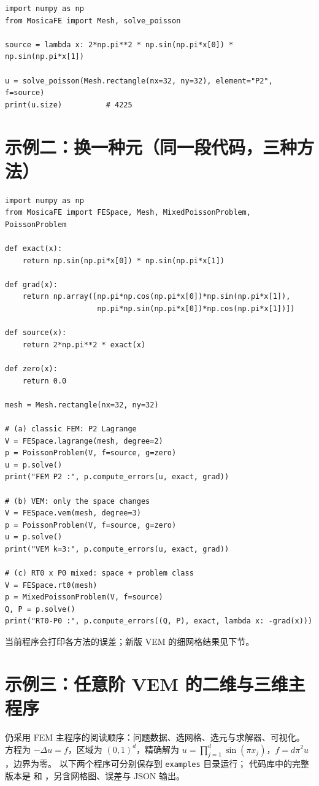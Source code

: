 \documentclass[UTF8,11pt,oneside]{ctexbook}
\theoremstyle{definition}
\theoremstyle{plain}
\newcommand{\code}[1]{\texttt{#1}}
\begin{document}
\begin{lstlisting}[language=MosicaFE,caption={示例 10.1：一行式求解}]
import numpy as np
from MosicaFE import Mesh, solve_poisson

source = lambda x: 2*np.pi**2 * np.sin(np.pi*x[0]) * np.sin(np.pi*x[1])

u = solve_poisson(Mesh.rectangle(nx=32, ny=32), element="P2", f=source)
print(u.size)          # 4225
\end{lstlisting}

\section{示例二：换一种元（同一段代码，三种方法）}

\begin{lstlisting}[language=MosicaFE,caption={示例 10.2：FEM / VEM / RT0 共用同一套流程},label={lst:three}]
import numpy as np
from MosicaFE import FESpace, Mesh, MixedPoissonProblem, PoissonProblem

def exact(x):
    return np.sin(np.pi*x[0]) * np.sin(np.pi*x[1])

def grad(x):
    return np.array([np.pi*np.cos(np.pi*x[0])*np.sin(np.pi*x[1]),
                     np.pi*np.sin(np.pi*x[0])*np.cos(np.pi*x[1])])

def source(x):
    return 2*np.pi**2 * exact(x)

def zero(x):
    return 0.0

mesh = Mesh.rectangle(nx=32, ny=32)

# (a) classic FEM: P2 Lagrange
V = FESpace.lagrange(mesh, degree=2)
p = PoissonProblem(V, f=source, g=zero)
u = p.solve()
print("FEM P2 :", p.compute_errors(u, exact, grad))

# (b) VEM: only the space changes
V = FESpace.vem(mesh, degree=3)
p = PoissonProblem(V, f=source, g=zero)
u = p.solve()
print("VEM k=3:", p.compute_errors(u, exact, grad))

# (c) RT0 x P0 mixed: space + problem class
V = FESpace.rt0(mesh)
p = MixedPoissonProblem(V, f=source)
Q, P = p.solve()
print("RT0-P0 :", p.compute_errors((Q, P), exact, lambda x: -grad(x)))
\end{lstlisting}

当前程序会打印各方法的误差；新版 VEM 的细网格结果见下节。

\section{示例三：任意阶 VEM 的二维与三维主程序}
仍采用 FEM 主程序的阅读顺序：问题数据、选网格、选元与求解器、可视化。
方程为 $-\Delta u=f$，区域为 $(0,1)^d$，精确解为
$u=\prod_{j=1}^d\sin(\pi x_j)$，$f=d\pi^2u$，边界为零。
以下两个程序可分别保存到 \code{examples} 目录运行；
代码库中的完整版本是  和
，另含网格图、误差与 JSON 输出。
\end{document}
